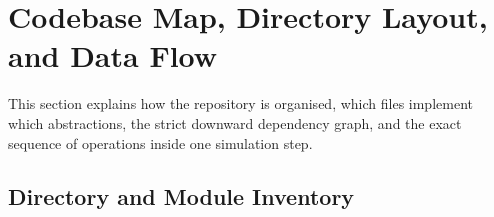\documentclass[11pt,a4paper]{article}
\begin{document}
\section{Codebase Map, Directory Layout, and Data Flow}
\label{sec:codebase}

This section explains how the repository is organised, which files implement which abstractions, the
strict downward dependency graph, and the exact sequence of operations inside one simulation step.

\subsection{Directory and Module Inventory}
\end{document}
